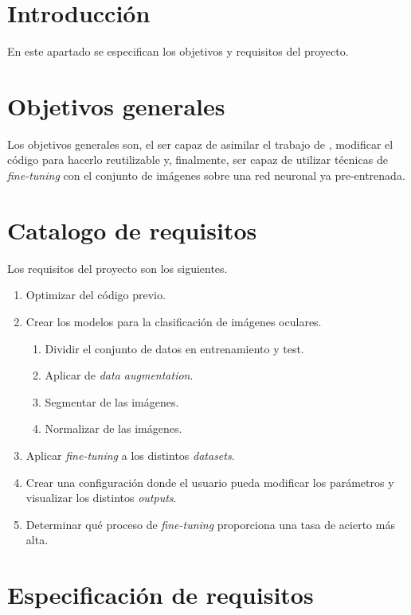 
\section{Introducción}

En este apartado se especifican los objetivos y requisitos del proyecto.

\section{Objetivos generales}

Los objetivos generales son, el ser capaz de asimilar el trabajo de \cite{tfg_iris_2020}, modificar el código para hacerlo reutilizable y, finalmente, ser capaz de 
utilizar técnicas de \textit{fine-tuning} con el conjunto de imágenes sobre una red neuronal ya pre-entrenada.

\section{Catalogo de requisitos}

Los requisitos del proyecto son los siguientes.

\begin{enumerate}
    \item Optimizar del código previo.
    \item Crear los modelos para la clasificación de imágenes oculares.
        \begin{enumerate}
            \item Dividir el conjunto de datos en entrenamiento y test.
            \item Aplicar de \textit{data augmentation}.
            \item Segmentar de las imágenes.
            \item Normalizar de las imágenes.
        \end{enumerate}
    \item Aplicar \textit{fine-tuning} a los distintos \textit{datasets}.
    \item Crear una configuración donde el usuario pueda modificar los parámetros y visualizar los distintos \textit{outputs}.
    \item Determinar qué proceso de \textit{fine-tuning} proporciona una tasa de acierto más alta.
  \end{enumerate}

\section{Especificación de requisitos}

